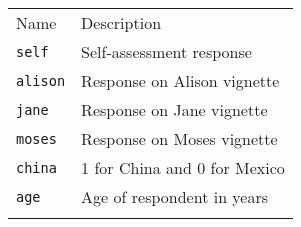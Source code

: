 \documentclass[]{article}
\begin{document}
\begin{longtable}[c]{@{}ll@{}}
\toprule\addlinespace
\begin{minipage}[b]{0.25\columnwidth}\raggedright
Name
\end{minipage} & \begin{minipage}[b]{0.68\columnwidth}\raggedright
Description
\end{minipage}
\\\addlinespace
\midrule\endhead
\begin{minipage}[t]{0.25\columnwidth}\raggedright
\texttt{self}
\end{minipage} & \begin{minipage}[t]{0.68\columnwidth}\raggedright
Self-assessment response
\end{minipage}
\\\addlinespace
\begin{minipage}[t]{0.25\columnwidth}\raggedright
\texttt{alison}
\end{minipage} & \begin{minipage}[t]{0.68\columnwidth}\raggedright
Response on Alison vignette
\end{minipage}
\\\addlinespace
\begin{minipage}[t]{0.25\columnwidth}\raggedright
\texttt{jane}
\end{minipage} & \begin{minipage}[t]{0.68\columnwidth}\raggedright
Response on Jane vignette
\end{minipage}
\\\addlinespace
\begin{minipage}[t]{0.25\columnwidth}\raggedright
\texttt{moses}
\end{minipage} & \begin{minipage}[t]{0.68\columnwidth}\raggedright
Response on Moses vignette
\end{minipage}
\\\addlinespace
\begin{minipage}[t]{0.25\columnwidth}\raggedright
\texttt{china}
\end{minipage} & \begin{minipage}[t]{0.68\columnwidth}\raggedright
1 for China and 0 for Mexico
\end{minipage}
\\\addlinespace
\begin{minipage}[t]{0.25\columnwidth}\raggedright
\texttt{age}
\end{minipage} & \begin{minipage}[t]{0.68\columnwidth}\raggedright
Age of respondent in years
\end{minipage}
\\\addlinespace
\bottomrule
\end{longtable}
\end{document}
